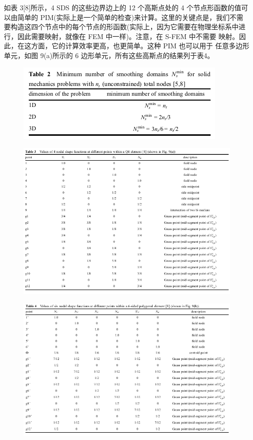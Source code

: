 \documentclass[12pt,a4paper]{article}
\begin{document}
如表 3[8]所示，4 SDS 的这些边界边上的 12 个高斯点处的 4 个节点形函数的值可以由简单的 PIM(实际上是一个简单的检查)来计算。这里的关键点是，我们不需要构造这四个节点中的每个节点的形函数(实际上，因为它需要在物理坐标系中进行，因此需要映射，就像在 FEM 中一样)。注意，在 S-FEM 中不需要
映射。因此，在这方面，它的计算效率更高，也更简单。这种 PIM 也可以用于
任意多边形单元，如图 9(a)所示的 6 边形单元，所有这些高斯点的结果列于表4。

\begin{figure}[H]
\centering
\includegraphics[scale=0.6]{./figures/10.png}
\caption{}
\end{figure}

\begin{figure}[H]
\centering
\includegraphics[scale=0.5]{./figures/11.png}
\caption{}
\end{figure}

\begin{figure}[H]
\centering
\includegraphics[scale=0.5]{./figures/12.png}
\caption{}
\end{figure}
\end{document}
